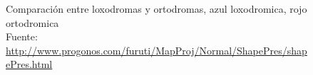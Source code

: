 \begin{description}
\begin{figure}[!h]
  \centering
  \caption{Comparaci\'on entre loxodromas y ortodromas, azul loxodromica, rojo ortodromica \\{\footnotesize Fuente: \url{http://www.progonos.com/furuti/MapProj/Normal/ShapePres/shapePres.html}}}
  \label{fig:comparacion.entre.loxodromas.y.ortodromas}
\end{figure}

\end{description}

